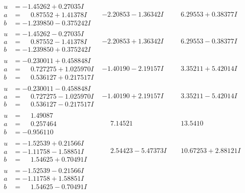 \documentclass[1p]{elsarticle_modified}
\theoremstyle{definition}
\begin{document}
$$\begin{array}{c|c|c}
\begin{aligned}
u &= -1.45262 + 0.27035 I \\
a &= \phantom{-}0.87552 + 1.41378 I \\
b &= -1.239850 - 0.375242 I\end{aligned}
 & -2.20853 - 1.36342 I & \phantom{-}6.29553 + 0.38377 I \\ \hline\begin{aligned}
u &= -1.45262 - 0.27035 I \\
a &= \phantom{-}0.87552 - 1.41378 I \\
b &= -1.239850 + 0.375242 I\end{aligned}
 & -2.20853 + 1.36342 I & \phantom{-}6.29553 - 0.38377 I \\ \hline\begin{aligned}
u &= -0.230011 + 0.458848 I \\
a &= \phantom{-}0.727275 + 1.025970 I \\
b &= \phantom{-}0.536127 + 0.217517 I\end{aligned}
 & -1.40190 - 2.19157 I & \phantom{-}3.35211 + 5.42014 I \\ \hline\begin{aligned}
u &= -0.230011 - 0.458848 I \\
a &= \phantom{-}0.727275 - 1.025970 I \\
b &= \phantom{-}0.536127 - 0.217517 I\end{aligned}
 & -1.40190 + 2.19157 I & \phantom{-}3.35211 - 5.42014 I \\ \hline\begin{aligned}
u &= \phantom{-}1.49087\phantom{ +0.000000I} \\
a &= \phantom{-}0.257464\phantom{ +0.000000I} \\
b &= -0.956110\phantom{ +0.000000I}\end{aligned}
 & \phantom{-}7.14521\phantom{ +0.000000I} & \phantom{-}13.5410\phantom{ +0.000000I} \\ \hline\begin{aligned}
u &= -1.52539 + 0.21566 I \\
a &= -1.11758 - 1.58851 I \\
b &= \phantom{-}1.54625 + 0.70491 I\end{aligned}
 & \phantom{-}2.54423 - 5.47373 I & \phantom{-}10.67253 + 2.88121 I \\ \hline\begin{aligned}
u &= -1.52539 - 0.21566 I \\
a &= -1.11758 + 1.58851 I \\
b &= \phantom{-}1.54625 - 0.70491 I\end{aligned}

\end{array}$$
\end{document}
